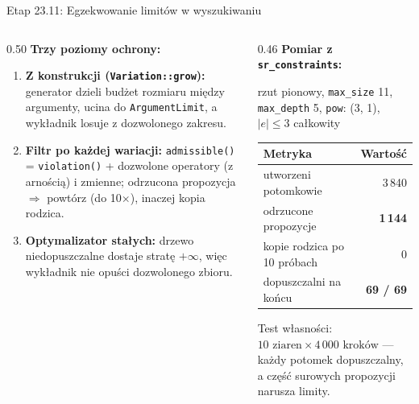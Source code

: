 \documentclass[
  polish,
  aspectratio=169,
]{beamer}
\begin{document}
\begin{frame}{Etap 23.11: Egzekwowanie limitów w wyszukiwaniu}
  \begin{columns}[T]
    \begin{column}{0.50\textwidth}
      \textbf{Trzy poziomy ochrony:}
      \begin{enumerate}\footnotesize
        \item \textbf{Z konstrukcji (\texttt{Variation::grow}):}
          generator dzieli budżet rozmiaru między argumenty, ucina do \texttt{ArgumentLimit}, a wykładnik losuje z dozwolonego zakresu.
        \item \textbf{Filtr po każdej wariacji:}
          \texttt{admissible()} = \texttt{violation()} + dozwolone operatory (z arnością) i zmienne; odrzucona propozycja $\Rightarrow$ powtórz (do 10$\times$), inaczej kopia rodzica.
        \item \textbf{Optymalizator stałych:}
          drzewo niedopuszczalne dostaje stratę $+\infty$, więc wykładnik nie opuści dozwolonego zbioru.
      \end{enumerate}
    \end{column}
    \begin{column}{0.46\textwidth}
      \textbf{Pomiar z \texttt{sr\_constraints}:}\par
      {\scriptsize\color{aghmuted}rzut pionowy, \texttt{max\_size} 11, \texttt{max\_depth} 5, \texttt{pow}: (3, 1), $|e|\le 3$ całkowity}\par\smallskip
      \footnotesize
      \begin{tabular}{@{}lr@{}}
        \toprule
        Metryka & Wartość \\
        \midrule
        utworzeni potomkowie & 3\,840 \\
        odrzucone propozycje & \textcolor{aghred}{\textbf{1\,144}} \\
        kopie rodzica po 10 próbach & 0 \\
        dopuszczalni na końcu & \textcolor{aghgreen}{\textbf{69 / 69}} \\
        \bottomrule
      \end{tabular}\par\medskip
      {\scriptsize Test własności: $10 \text{ ziaren} \times 4\,000 \text{ kroków}$ --- każdy potomek dopuszczalny, a część surowych propozycji narusza limity.}
    \end{column}
  \end{columns}
\end{frame}
\end{document}
